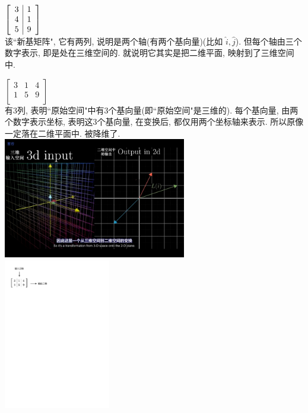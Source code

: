 \documentclass[UTF8]{ctexart}
\begin{document}
\begin{myEnvSample}
$\left[ \begin{array}{c |c}
	3&		1\\
	4&		1\\
	5&		9\\
\end{array} \right]$ \\

该``新基矩阵", 它有两列, 说明是两个轴(有两个基向量)(比如 $\hat{i}, \hat{j}$). 但每个轴由三个数字表示, 即是处在三维空间的. 就说明它其实是把二维平面, 映射到了三维空间中.
\end{myEnvSample}



\begin{myEnvSample}
$\left[ \begin{array}{c|c|c}
	3&		1&		4\\
	1&		5&		9\\
\end{array} \right]$ \\

有3列, 表明``原始空间"中有3个基向量(即``原始空间"是三维的). 每个基向量, 由两个数字表示坐标, 表明这3个基向量, 在变换后, 都仅用两个坐标轴来表示. 所以原像一定落在二维平面中. 被降维了.\\

\includegraphics[width=0.6\textwidth]{img/0040.png}\\
\includegraphics[width=0.35\textwidth]{img/0041.pdf}
\end{myEnvSample}
\end{document}
